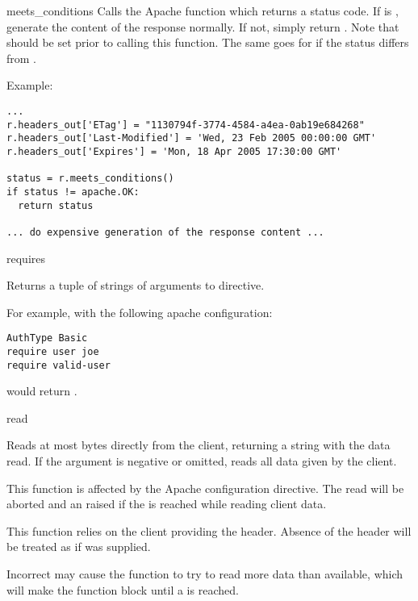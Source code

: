 \begin{methoddesc}[request]{meets_conditions}{}
  Calls the Apache  function which
  returns a status code.  If  is , generate
  the content of the response normally.  If not, simply return .
  Note that  should be set prior to calling this
  function.  The same goes for  if the status differs
  from .

  Example:
  \begin{verbatim}
...
r.headers_out['ETag'] = "1130794f-3774-4584-a4ea-0ab19e684268"
r.headers_out['Last-Modified'] = 'Wed, 23 Feb 2005 00:00:00 GMT'
r.headers_out['Expires'] = 'Mon, 18 Apr 2005 17:30:00 GMT'

status = r.meets_conditions()
if status != apache.OK:
  return status

... do expensive generation of the response content ... 
\end{verbatim}

\end{methoddesc}


\begin{methoddesc}[request]{requires}{}

  Returns a tuple of strings of arguments to  directive.
  
  For example, with the following apache configuration:
  \begin{verbatim}
AuthType Basic
require user joe
require valid-user
  \end{verbatim}
   would return .

\end{methoddesc}

\begin{methoddesc}[request]{read}{}

  Reads at most  bytes directly from the client, returning a
  string with the data read. If the  argument is negative or
  omitted, reads all data given by the client.

  This function is affected by the  Apache configuration
  directive. The read will be aborted and an 
  raised if the  is reached while reading client data.

  This function relies on the client providing the 
  header. Absence of the  header will be treated as
  if  was supplied.

  Incorrect  may cause the function to try to read
  more data than available, which will make the function block until a
   is reached.

\end{methoddesc}

